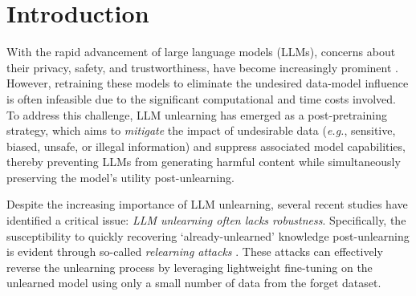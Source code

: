 \section{Introduction}
\label{sec: intro}



With the rapid advancement of large language models (LLMs), concerns about their privacy, safety, and trustworthiness, have become increasingly prominent \citep{liu2024towards,barez2025open}. However, retraining these models to eliminate the undesired data-model influence is often infeasible due to the significant computational and time costs involved. To address this challenge, LLM unlearning \citep{yao2024large,eldan2023whos,maini2024tofu,liu2024rethinking} has emerged as a post-pretraining strategy, which aims to \textit{mitigate} the impact of undesirable data (\textit{e.g.}, sensitive, biased, unsafe, or illegal information) and suppress associated model capabilities, thereby preventing LLMs from generating harmful content while simultaneously preserving the model's utility post-unlearning.




Despite the increasing importance of LLM unlearning, several recent studies \citep{lucki2024adversarial,zhang2024does,lynch2024eight,hu2024jogging,deeb2024unlearning} 
%
have identified a critical issue: \textit{LLM unlearning often lacks robustness}. Specifically, the susceptibility to quickly recovering `already-unlearned' knowledge post-unlearning is evident through so-called \textit{relearning attacks} \citep{lynch2024eight,hu2024jogging}. These attacks can effectively reverse the unlearning process by leveraging lightweight fine-tuning on the unlearned model using only a small number of data from the forget dataset.



